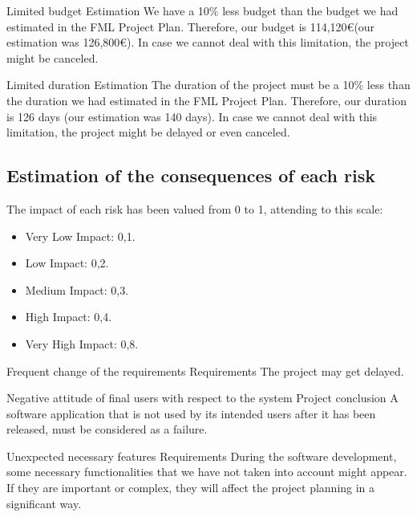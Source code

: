 \begin{risk}{Limited budget}
\riskcat Estimation
\riskdesc We have a 10\% less budget than the budget we had estimated in the FML Project Plan. Therefore, our budget is 114,120\euro (our estimation was 126,800\euro). In case we cannot deal with this limitation, the project might be canceled.
\end{risk}

\begin{risk}{Limited duration}
\riskcat Estimation
\riskdesc The duration of the project must be a 10\% less than the duration we had estimated in the FML Project Plan. Therefore, our duration is 126 days (our estimation was 140 days). In case we cannot deal with this limitation, the project might be delayed or even canceled.
\end{risk}



\subsection{Estimation of the consequences of each risk}

The impact of each risk has been valued from 0 to 1, attending to this scale:
\begin{itemize}
\item Very Low Impact: 0,1.
\item Low Impact: 0,2.
\item Medium Impact: 0,3.
\item High Impact: 0,4.
\item Very High Impact: 0,8.
\end{itemize}

\begin{risk}{Frequent change of the requirements}
\riskcat Requirements
 The project may get delayed.
\end{risk}

\begin{risk}{Negative attitude of final users with respect to the system}
\riskcat Project conclusion
\riskdesc A software application that is not used by its intended users after it has been released, must be considered as a failure. 
\end{risk}

\begin{risk}{Unexpected necessary features}
\riskcat Requirements
\riskdesc During the software development, some necessary functionalities that we have not taken into account might appear. If they are important or complex, they will affect the project planning in a significant way.
\end{risk}

